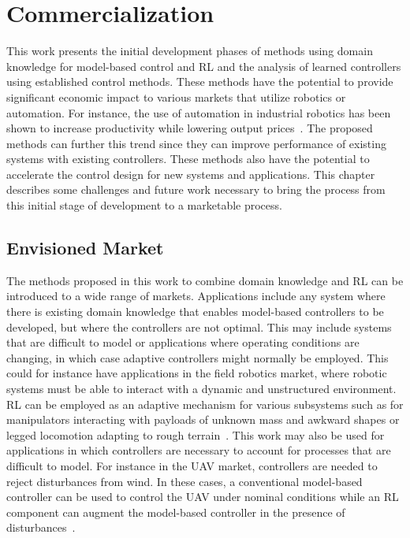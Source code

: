 
\chapter{Commercialization}
\label{chapter6}

This work presents the initial development phases of methods using domain knowledge for model-based control and RL and the analysis of learned controllers using established control methods. These methods have the potential to provide significant economic impact to various markets that utilize robotics or automation.
%
For instance, the use of automation in industrial robotics has been shown to increase productivity while lowering output prices~\cite{Graetz:2018a}.
%
The proposed methods can further this trend since they can improve performance of existing systems with existing controllers. These methods also have the potential to accelerate the control design for new systems and applications.
%
This chapter describes some challenges and future work necessary to bring the process from this initial stage of development to a marketable process.

\section{Envisioned Market}
%
The methods proposed in this work to combine domain knowledge and RL can be introduced to a wide range of markets. Applications include any system where there is existing domain knowledge that enables model-based controllers to be developed, but where the controllers are not optimal. This may include systems that are difficult to model or applications where operating conditions are changing, in which case adaptive controllers might normally be employed. This could for instance have applications in the field robotics market, where robotic systems must be able to interact with a dynamic and unstructured environment. RL can be employed as an adaptive mechanism for various subsystems such as for manipulators interacting with payloads of unknown mass and awkward shapes or legged locomotion adapting to rough terrain~\cite{Gangapurwala:2022a}.
%
This work may also be used for applications in which controllers are necessary to account for processes that are difficult to model. For instance in the UAV market, controllers are needed to reject disturbances from wind. In these cases, a conventional model-based controller can be used to control the UAV under nominal conditions while an RL component can augment the model-based controller in the presence of disturbances~\cite{Ishihara:2023a}.

